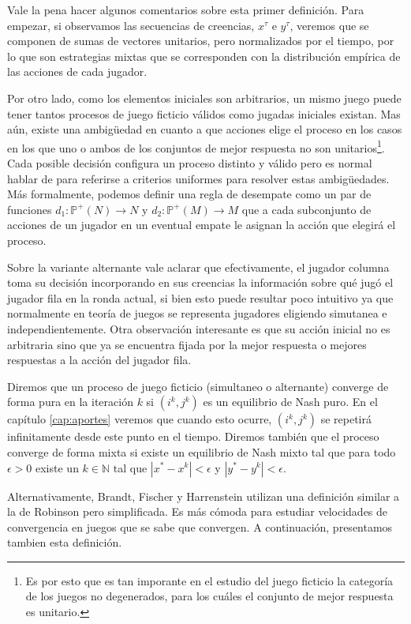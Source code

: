 Vale la pena hacer algunos comentarios sobre esta primer definición. Para empezar, si observamos las secuencias de creencias, $x^\tau$ e $y^\tau$, veremos que se componen de sumas de vectores unitarios, pero normalizados por el tiempo, por lo que son estrategias mixtas que se corresponden con la distribución empírica de las acciones de cada jugador.

Por otro lado, como los elementos iniciales son arbitrarios, un mismo juego puede tener tantos procesos de juego ficticio válidos como jugadas iniciales existan. Mas aún, existe una ambigüedad en cuanto a que acciones elige el proceso en los casos en los que uno o ambos de los conjuntos de mejor respuesta no son unitarios\footnote{Es por esto que es tan imporante en el estudio del juego ficticio la categoría de los juegos no degenerados, para los cuáles el conjunto de mejor respuesta es unitario.}. Cada posible decisión configura un proceso distinto y válido pero es normal hablar de  para referirse a criterios uniformes para resolver estas ambigüedades. Más formalmente, podemos definir una regla de desempate como un par de funciones $d_1: \mathbb{P}^+(N) \rightarrow N$ y $d_2: \mathbb{P}^+(M) \rightarrow M$ que a cada subconjunto de acciones de un jugador en un eventual empate le asignan la acción que elegirá el proceso.

Sobre la variante alternante vale aclarar que efectivamente, el jugador columna toma su decisión incorporando en sus creencias la información sobre qué jugó el jugador fila en la ronda actual, si bien esto puede resultar poco intuitivo ya que normalmente en teoría de juegos se representa jugadores eligiendo simutanea e independientemente. Otra observación interesante es que su acción inicial no es arbitraria sino que ya se encuentra fijada por la mejor respuesta o mejores respuestas a la acción del jugador fila.

Diremos que un proceso de juego ficticio (simultaneo o alternante) converge de forma pura en la iteración $k$ si $(i^k, j^k)$ es un equilibrio de Nash puro. En el capítulo \ref{cap:aportes} veremos que cuando esto ocurre, $(i^k, j^k)$ se repetirá infinitamente desde este punto en el tiempo. Diremos también que el proceso converge de forma mixta si existe un equilibrio de Nash mixto tal que para todo $\epsilon > 0$ existe un $k \in \mathbb{N}$ tal que $|x^* - x^k| < \epsilon$ y $|y^* - y^k| < \epsilon$.

Alternativamente, Brandt, Fischer y Harrenstein utilizan una definición similar a la de Robinson \cite{robinson:zerosum} pero simplificada. Es más cómoda para estudiar velocidades de convergencia en juegos que se sabe que convergen. A continuación, presentamos tambien esta definición.

